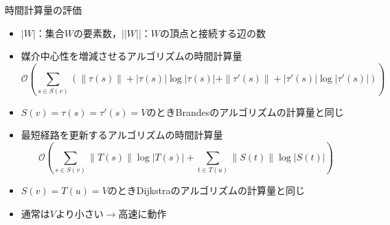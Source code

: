 \documentclass[dvipdfmx,fleqn]{beamer}
\begin{document}
\begin{frame}{時間計算量の評価}
  \begin{itemize}\small
    \item $|W|$：集合$W$の要素数，$||W||$：$W$の頂点と接続する辺の数
    \item 媒介中心性を増減させるアルゴリズムの時間計算量
    \begin{equation*}
      \mathcal{O}\left(\sum_{s\in S(v)}\left(\|\tau(s)\|+|\tau(s)|\log|\tau(s)|+\|\tau'(s)\|+|\tau'(s)|\log|\tau'(s)|\right)\right)
    \end{equation*}
  \item[] \alert{$S(v)=\tau(s)=\tau'(s)=V$}のときBrandesのアルゴリズムの計算量と同じ
    \item 最短経路を更新するアルゴリズムの時間計算量
    \begin{equation*}
      \mathcal{O}\left(\sum_{s\in S(v)}\|T(s)\|\log|T(s)|+\sum_{t\in T(u)}\|S(t)\|\log|S(t)|\right)
    \end{equation*}
  \item[] \alert{$S(v)=T(u)=V$}のときDijkstraのアルゴリズムの計算量と同じ
  \item 通常は$V$より小さい$\rightarrow$\alert{高速に動作}
  \end{itemize}
\end{frame}
\end{document}
